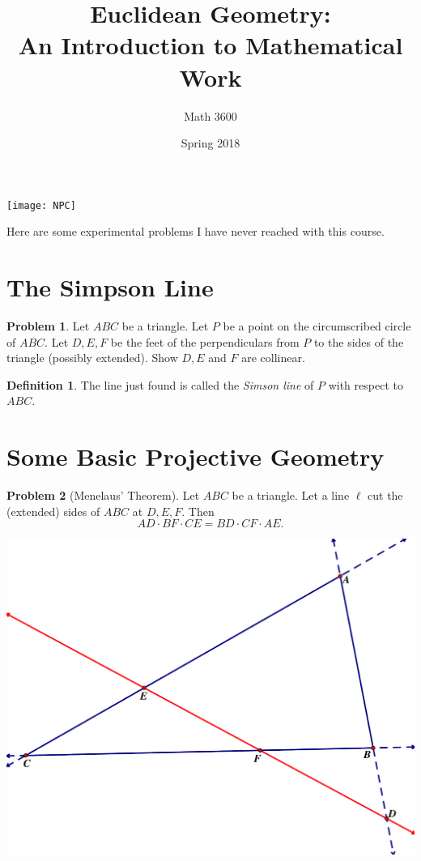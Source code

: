 \documentclass{tufte-handout}
\title{Euclidean Geometry:\\An Introduction to Mathematical Work}
\author[]{Math 3600}
\date{Spring 2018}
\theoremstyle{definition}
\newtheorem{problem}{Problem}[section]
\newtheorem*{definition}{Definition}
\begin{document}
\maketitle

\begin{marginfigure}
    \texttt{[image: NPC]}
\end{marginfigure}

\vspace{.5in}
Here are some experimental problems I have never reached with this course.

\setcounter{section}{19}
\section{The Simpson Line}

\begin{problem}\label{prob:Simson-line}
Let $ABC$ be a triangle. Let $P$ be a point on the circumscribed circle of $ABC$. Let $D, E, F$ be the feet of the perpendiculars from $P$ to the sides of the triangle (possibly extended). Show $D, E$ and $F$ are collinear.
\end{problem}

\begin{definition}\label{defn:Simson-line}
The line just found is called the \emph{Simson line} of $P$ with respect to $ABC$.
\end{definition}


\section{Some Basic Projective Geometry}

\begin{problem}[Menelaus' Theorem]\label{prob:Menelaus-theorem}
Let $ABC$ be a triangle. Let a line $\ell$ cut the (extended) sides of $ABC$ at $D, E, F$. Then
\[ AD\cdot BF \cdot CE = BD \cdot CF \cdot AE .\]
\end{problem}


\begin{center}
\includegraphics[width=.9\textwidth]{Menelaus.pdf}
\end{center}
\end{document}
